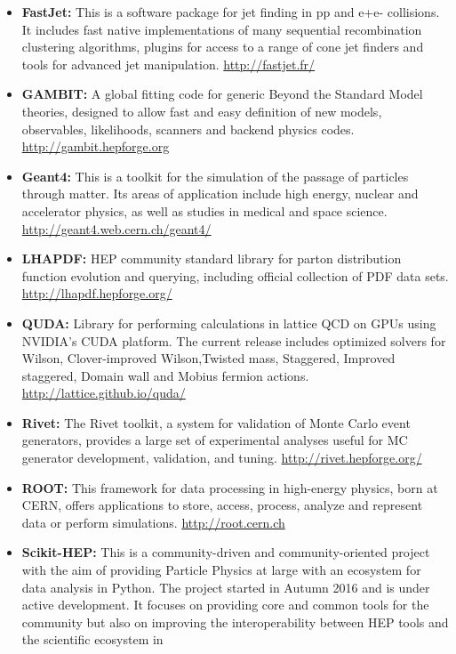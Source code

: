 \begin{itemize}
\item
  \textbf{FastJet:} This is a software package for jet finding in pp and
  e+e- collisions. It includes fast native implementations of many
  sequential recombination clustering algorithms, plugins for access to
  a range of cone jet finders and tools for advanced jet manipulation.
  \url{http://fastjet.fr/}
\item
  \textbf{GAMBIT:} A global fitting code for generic Beyond the Standard
  Model theories, designed to allow fast and easy definition of new
  models, observables, likelihoods, scanners and backend physics codes.
  \url{http://gambit.hepforge.org}
\item
  \textbf{Geant4:} This is a toolkit for the simulation of the passage
  of particles through matter. Its areas of application include high
  energy, nuclear and accelerator physics, as well as studies in medical
  and space science. \url{http://geant4.web.cern.ch/geant4/}
\item
  \textbf{LHAPDF:} HEP community standard library for parton
  distribution function evolution and querying, including official
  collection of PDF data sets. \url{http://lhapdf.hepforge.org/}
\item
  \textbf{QUDA:} Library for performing calculations in lattice QCD on
  GPUs using NVIDIA's CUDA platform. The current release includes
  optimized solvers for Wilson, Clover-improved Wilson,Twisted mass,
  Staggered, Improved staggered, Domain wall and Mobius fermion actions.
  \url{http://lattice.github.io/quda/}
\item
  \textbf{Rivet:} The Rivet toolkit, a system for validation of Monte
  Carlo event generators, provides a large set of experimental analyses
  useful for MC generator development, validation, and tuning.
  \url{http://rivet.hepforge.org/}
\item
  \textbf{ROOT:} This framework for data processing in high-energy
  physics, born at CERN, offers applications to store, access, process,
  analyze and represent data or perform simulations.
  \url{http://root.cern.ch}
\item
  \textbf{Scikit-HEP:} This is a community-driven and community-oriented
  project with the aim of providing Particle Physics at large with an
  ecosystem for data analysis in Python. The project started in Autumn
  2016 and is under active development. It focuses on providing core and
  common tools for the community but also on improving the
  interoperability between HEP tools and the scientific ecosystem in

\end{itemize}
